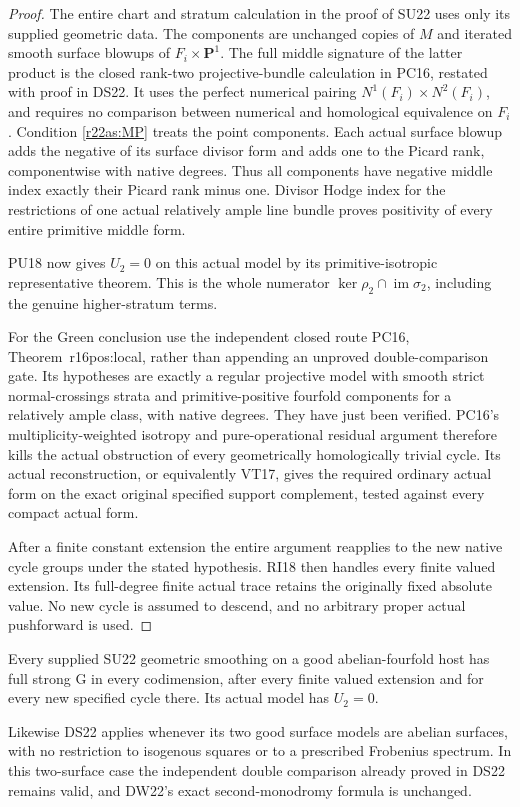 \begin{proof}
The entire chart and stratum calculation in the proof of
SU22 uses only its supplied geometric data.  The components
are unchanged copies of $M$ and iterated smooth surface
blowups of $F_i\times\mathbf P^1$.  The full middle
signature of the latter product is the closed rank-two
projective-bundle calculation in PC16, restated with
proof in DS22.  It uses the perfect numerical pairing
$N^1(F_i)\times N^2(F_i)$, and requires no comparison
between numerical and homological equivalence on $F_i$.
Condition \eqref{r22as:MP} treats the point components.
Each actual surface blowup adds the negative of its
surface divisor form and adds one to the Picard rank,
componentwise with native degrees.  Thus all components
have negative middle index exactly their Picard rank
minus one.  Divisor Hodge index for the restrictions of
one actual relatively ample line bundle proves positivity
of every entire primitive middle form.

PU18 now gives $U_2=0$ on this actual model by its
primitive-isotropic representative theorem.  This is
the whole numerator $\ker\rho_2\cap\operatorname{im}\sigma_2$,
including the genuine higher-stratum terms.

For the Green conclusion use the independent closed route
PC16, Theorem~\textup{r16pos:local}, rather than appending
an unproved double-comparison gate.  Its hypotheses are
exactly a regular projective model with smooth strict
normal-crossings strata and primitive-positive fourfold
components for a relatively ample class, with native
degrees.  They have just been verified.  PC16's
multiplicity-weighted isotropy and pure-operational
residual argument therefore kills the actual obstruction
of every geometrically homologically trivial cycle.
Its actual reconstruction, or equivalently VT17, gives
the required ordinary actual form on the exact original
specified support complement, tested against every
compact actual form.

After a finite constant extension the entire argument
reapplies to the new native cycle groups under the
stated hypothesis.  RI18 then handles every finite
valued extension.  Its full-degree finite actual trace
retains the originally fixed absolute value.  No
new cycle is assumed to descend, and no arbitrary
proper actual pushforward is used.
\end{proof}

\begin{corollary}
\label{r22as:abelianlocal}
Every supplied SU22 geometric smoothing on a good
abelian-fourfold host has full strong G in every
codimension, after every finite valued extension and
for every new specified cycle there.  Its actual
model has $U_2=0$.

Likewise DS22 applies whenever its two good surface
models are abelian surfaces, with no restriction to
isogenous squares or to a prescribed Frobenius spectrum.
In this two-surface case the independent double
comparison already proved in DS22 remains valid,
and DW22's exact second-monodromy formula is unchanged.
\end{corollary}

